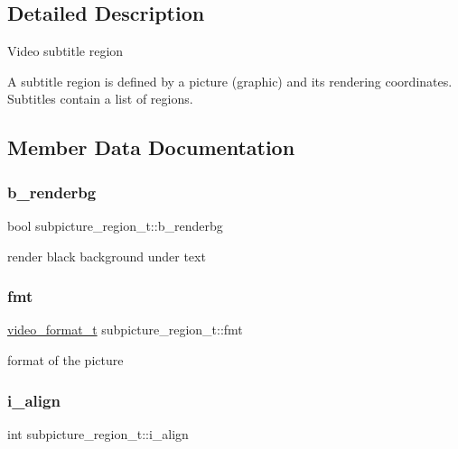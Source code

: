 \subsection{Detailed Description}
Video subtitle region

A subtitle region is defined by a picture (graphic) and its rendering coordinates. Subtitles contain a list of regions. 

\subsection{Member Data Documentation}
\mbox{\label{structsubpicture__region__t_aec9a691c5feb0113665dc32baad447ac}} 
\subsubsection{\texorpdfstring{b\+\_\+renderbg}{b\_renderbg}}
{\footnotesize\ttfamily bool subpicture\+\_\+region\+\_\+t\+::b\+\_\+renderbg}

render black background under text \mbox{\label{structsubpicture__region__t_a6f825fe2ca5b424933af974e4ed03035}} 
\subsubsection{\texorpdfstring{fmt}{fmt}}
{\footnotesize\ttfamily \hyperlink{structvideo__format__t}{video\+\_\+format\+\_\+t} subpicture\+\_\+region\+\_\+t\+::fmt}

format of the picture \mbox{\label{structsubpicture__region__t_a06d8795f35bdeb4843dcfc460d96b1a7}} 
\subsubsection{\texorpdfstring{i\+\_\+align}{i\_align}}
{\footnotesize\ttfamily int subpicture\+\_\+region\+\_\+t\+::i\+\_\+align}

